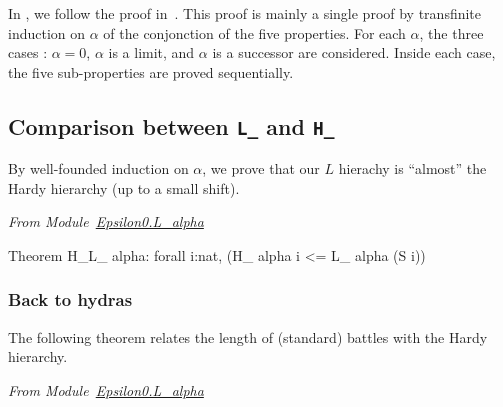 
In \coq{}, we follow the  proof in~\cite{KS81}. This proof is mainly a single  proof by transfinite induction on $\alpha$ of the conjonction of the five properties.
For each $\alpha$, the three cases : $\alpha=0$, $\alpha$ is a limit, and 
$\alpha$ is a successor are considered. Inside each case, the five sub-properties are proved sequentially. 






\subsection{Comparison between \texttt{L\_} and \texttt{H\_} }

By well-founded induction on $\alpha$, we prove that our $L$ hierachy is ``almost'' the Hardy hierarchy (up to a small shift).

\emph{From Module~\href{../theories/html/hydras.Epsilon0.L_alpha.html\#H_L_}{Epsilon0.L\_alpha}}

\begin{Coqsrc}
 Theorem H_L_ alpha: forall i:nat,  (H_ alpha i <= L_ alpha (S i))%
\end{Coqsrc}
 
\subsubsection{Back to hydras}

The following theorem relates the length of (standard) battles with the Hardy hierarchy.

\emph{From Module~\href{../theories/html/hydras.Epsilon0.L_alpha.html}{Epsilon0.L\_alpha}}

